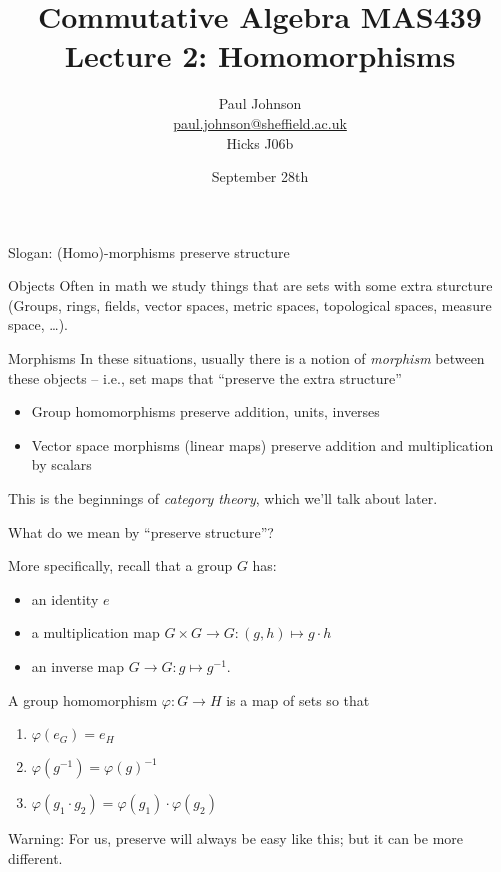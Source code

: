 \documentclass{beamer}
\title{Commutative Algebra MAS439 \\ Lecture 2: Homomorphisms}
\author{Paul Johnson \\ \href{mailto:paul.johnson@sheffield.ac.uk}{paul.johnson@sheffield.ac.uk} \\ Hicks J06b}
\date{September 28th}
\begin{document}
\begin{frame}
\titlepage
\end{frame}

\begin{frame}{Slogan: (Homo)-morphisms preserve structure}
\begin{block}{Objects}  Often in math we study things that are sets with some extra sturcture (Groups, rings, fields, vector spaces, metric spaces, topological spaces, measure space, \dots).
\end{block}
\begin{block}{Morphisms}  In these situations, usually there is a notion of \emph{morphism} between these objects -- i.e., set maps that ``preserve the extra structure''
\end{block}
  \begin{itemize}
  \item Group homomorphisms preserve addition, units, inverses
    \item Vector space morphisms (linear maps) preserve addition and multiplication by scalars
\end{itemize}
This is the beginnings of \emph{category theory}, which we'll talk about later.
\end{frame}

\begin{frame}{What do we mean by ``preserve structure''?}

  More specifically, recall that a group $G$ has:
  \begin{itemize}
  \item an identity $e$
  \item a multiplication map $G\times G\to G: (g,h)\mapsto g\cdot h$
    \item an inverse map $G\to G:g\mapsto g^{-1}$.
  \end{itemize}
  
  \begin{definition}
    A group homomorphism $\varphi:G\to H$ is a map of sets so that
    \begin{enumerate}
    \item $\varphi(e_G)=e_H$
    \item $\varphi(g^{-1})=\varphi(g)^{-1}$
      \item $\varphi(g_1\cdot g_2)=\varphi(g_1)\cdot \varphi(g_2)$
      \end{enumerate}
\end{definition}

\alert{Warning:} For us, preserve will always be easy like this; but it can be more different. 
\end{frame}
\end{document}
